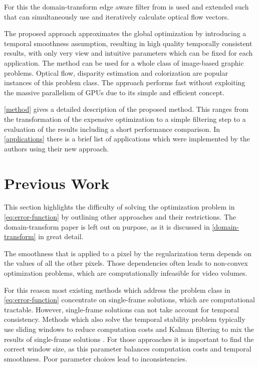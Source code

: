 \documentclass{utue} %
\begin{document}
For this the domain-transform edge aware filter from
\cite{GastalOliveira2011DomainTransform} is used and extended such that can
simultaneously use and iteratively calculate optical flow vectors.

The proposed approach approximates the global optimization by introducing a
temporal smoothness assumption, resulting in high quality temporally consistent
results, with only very view and intuitive parameters which can be fixed for
each application. The method can be used for a whole class of image-based
graphic problems. Optical flow, disparity estimation and colorization are
popular instances of this problem class. The approach performs fast without
exploiting the massive parallelism of GPUs due to its simple and efficient
concept.

\autoref{method} gives a detailed description of the proposed method. This
ranges from the transformation of the expensive optimization to a simple
filtering step to a evaluation of the results including a short performance
comparison. In \autoref{applications} there is a brief list of applications
which were implemented by the authors using their new approach.

\section{Previous Work}
This section highlights the difficulty of solving the optimization problem in
\autoref{eq:error-function} by outlining other approaches and their
restrictions. The domain-transform paper
\cite{GastalOliveira2011DomainTransform} is left out on purpose, as it is
discussed in \autoref{domain-transform} in great detail.

The smoothness that is applied to a pixel by the regularization term depends on
the values of all the other pixels. Those dependencies often leads to non-convex
optimization problems, which are computationally infeasible for video volumes.

For this reason most existing methods which address the problem class in
\autoref{eq:error-function} concentrate on single-frame solutions, which are
computational tractable. However, single-frame solutions can not take account
for temporal consistency. Methods which also solve the temporal stability
problem typically use sliding windows to reduce computation costs
\cite{conf/psivt/HosniRBG11} and Kalman filtering to mix the results of
single-frame solutions \cite{conf/acivs/HoffkenOK11}. For those approaches it is
important to find the correct window size, as this parameter balances
computation costs and temporal smoothness. Poor parameter choices lead to
inconsistencies.
\end{document}
